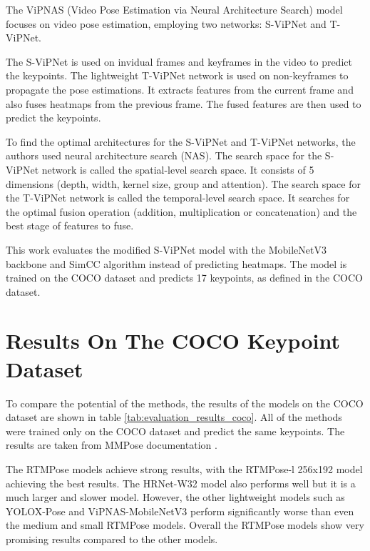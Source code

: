 The ViPNAS (Video Pose Estimation via Neural Architecture Search) \cite{vipnas} model focuses on video pose estimation, employing two networks: S-ViPNet and T-ViPNet.

The S-ViPNet is used on invidual frames and keyframes in the video to predict the keypoints. The lightweight T-ViPNet network is used on non-keyframes to propagate the pose estimations. It extracts features from the current frame and also fuses heatmaps from the previous frame. The fused features are then used to predict the keypoints.

To find the optimal architectures for the S-ViPNet and T-ViPNet networks, the authors used neural architecture search (NAS). The search space for the S-ViPNet network is called the spatial-level search space. It consists of 5 dimensions (depth, width, kernel size, group and attention). The search space for the T-ViPNet network is called the temporal-level search space. It searches for the optimal fusion operation (addition, multiplication or concatenation) and the best stage of features to fuse.

This work evaluates the modified S-ViPNet model with the MobileNetV3 \cite{mobilenetv3} backbone and SimCC \cite{simcc} algorithm instead of predicting heatmaps. The model is trained on the COCO dataset and predicts 17 keypoints, as defined in the COCO dataset.

\section{Results On The COCO Keypoint Dataset}
To compare the potential of the methods, the results of the models on the COCO dataset are shown in table \ref{tab:evaluation_results_coco}. All of the methods were trained only on the COCO dataset and predict the same keypoints. The results are taken from MMPose documentation \cite{mmpose2020}.

The RTMPose models achieve strong results, with the RTMPose-l 256x192 model achieving the best results. The HRNet-W32 model also performs well but it is a much larger and slower model. However, the other lightweight models such as YOLOX-Pose and ViPNAS-MobileNetV3 perform significantly worse than even the medium and small RTMPose models. Overall the RTMPose models show very promising results compared to the other models.


